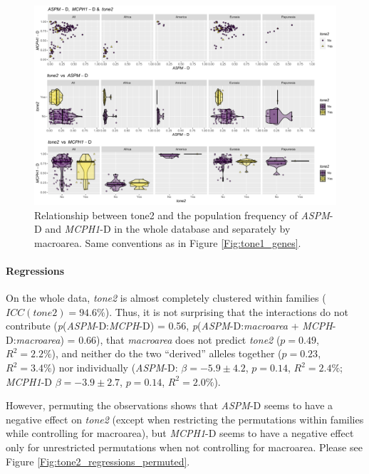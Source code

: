 \documentclass[twoside,onecolumn]{article}
\begin{document}
\begin{figure}[h]
  \centering
  \includegraphics[width=\textwidth]{../../code/figures/tone2_genes}
  \caption{Relationship between tone2 and the population frequency of \textit{ASPM}-D and \textit{MCPH1}-D in the whole database and separately by macroarea. Same conventions as in Figure \ref{Fig:tone1_genes}.}
  \label{Fig:tone2_genes}
\end{figure}


\paragraph{Regressions}

On the whole data, \textit{tone2} is almost completely clustered within families ($ICC(tone2) =94.6\%$).
Thus, it is not surprising that the interactions do not contribute (\textit{p}(\textit{ASPM}-D:\textit{MCPH}-D) = 0.56, \textit{p}(\textit{ASPM}-D:\textit{macroarea} + \textit{MCPH}-D:\textit{macroarea}) = 0.66), that \textit{macroarea} does not predict \textit{tone2} ($p = 0.49$, $R^2 = 2.2\%$), and neither do the two ``derived'' alleles together ($p = 0.23$, $R^2 = 3.4\%$) nor individually (\textit{ASPM}-D: $\beta = -5.9 \pm 4.2$, $p = 0.14$, $R^2 = 2.4\%$; \textit{MCPH1}-D $\beta = -3.9 \pm 2.7$, $p = 0.14$, $R^2 = 2.0\%$).

However, permuting the observations shows that \textit{ASPM}-D seems to have a negative effect on \textit{tone2} (except when restricting the permutations within families while controlling for macroarea), but \textit{MCPH1}-D seems to have a negative effect only for unrestricted permutations when not controlling for macroarea.
Please see Figure \ref{Fig:tone2_regressions_permuted}.
\end{document}
